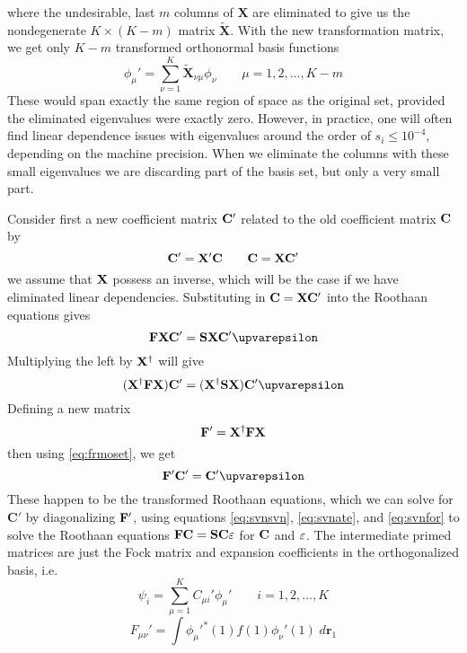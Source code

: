 \documentclass[11pt]{article}
\begin{document}
where the undesirable, last $m$ columns of $\mathbf{X}$ are eliminated to give us the nondegenerate  $K\times (K-m)$ matrix $\mathbf{\tilde{X}}$. With the new transformation matrix, we get only $K-m$ transformed orthonormal basis functions
\begin{equation}\label{}
\phi_\mu' = \sum_{\nu=1}^K \mathbf{\tilde{X}}_{\nu \mu} \phi_\nu \qquad \mu = 1, 2, \dots, K-m 
\end{equation}
These would span exactly the same region of space as the original set, provided the eliminated eigenvalues were exactly zero. However, in practice, one will often find linear dependence issues with eigenvalues around the order of $s_i\leq 10^{-4}$, depending on the machine precision. When we eliminate the columns with these small eigenvalues we are discarding part of the basis set, but only a very small part. 

Consider first a new coefficient matrix $\bf C'$ related to the old coefficient matrix $\bf C$ by 
\begin{equation}\label{eq:svnfor}
\bf C' = X'C \qquad C = XC'
\end{equation}
we assume that $\bf X$ possess an inverse, which will be the case if we have eliminated linear dependencies. Substituting in $\bf C = XC'$ into the Roothaan equations gives
\begin{equation}\label{}
\bf \mathbf{FXC}' = {\mathbf{SXC}'\bm{\upvarepsilon}}
\end{equation} 
Multiplying the left by $\mathbf{X}^\dagger$ will give
\begin{equation}\label{eq:svnsix}
\bf ({X}^\t {FX}){C'} = ({X}^\t {SX}){C}' {\bm{\upvarepsilon}}
\end{equation}
Defining a new matrix 
\begin{equation}\label{eq:svnsvn}
\bf F'  = X^\dagger F X 
\end{equation} 
then using \eqref{eq:frmoset}, we get
\begin{equation}\label{eq:svnate}
\bf F' C' = C' \bm{\upvarepsilon}
\end{equation}
These happen to be the transformed Roothaan equations, which we can solve for $ \textbf{C}' $ by diagonalizing $ \bf F' $, using equations \eqref{eq:svnsvn}, \eqref{eq:svnate}, and \eqref{eq:svnfor} to solve the Roothaan equations $ \bf FC = SC\varepsilon  $ for $\bf C $ and $ \varepsilon  $. The intermediate primed matrices are just the Fock matrix and expansion coefficients in the orthogonalized basis, i.e.
\begin{equation}\label{eq:svnin}
\psi_i = \sum_{\mu=1}^K C_{\mu i}' \phi_\mu' \qquad i = 1, 2, \dots, K
\end{equation}
\begin{equation}\label{key}
F_{\mu\nu}' = \int\phi_\mu'^{*} (1) f(1) \phi_\nu' (1) \; d\mathbf{r}_1
\end{equation}
\end{document}
